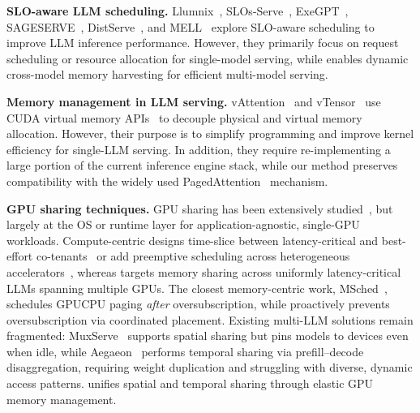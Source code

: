 

\label{sec:rw}

\noindent\textbf{SLO-aware LLM scheduling.}
Llumnix~\cite{sun2024llumnix}, SLOs-Serve~\cite{chen2025slos}, ExeGPT~\cite{oh2024exegpt}, SAGESERVE~\cite{sageserve}, DistServe~\cite{zhong2024distserve}, and MELL~\cite{qianli2025mell} explore SLO-aware scheduling to improve LLM inference performance.
However, they primarily focus on request scheduling or resource allocation for single-model serving, while \tool enables dynamic cross-model memory harvesting for efficient multi-model serving.

\noindent\textbf{Memory management in LLM serving.} 
vAttention~\cite{prabhu2024vattentiondynamicmemorymanagement} and vTensor~\cite{vtensor} use CUDA virtual memory APIs~\cite{cuda-vmm} to decouple physical and virtual memory allocation.
However, their purpose is to simplify programming 
and improve kernel efficiency for single-LLM serving. 
In addition, they require re-implementing a large portion of the current inference engine stack, while our method preserves compatibility with the widely used PagedAttention~\cite{kwon2023efficient} mechanism.

\noindent\textbf{GPU sharing techniques.}
GPU sharing has been extensively studied~\cite{zhang2025sgdrc, zhang2025improving, ng2023paella, strati2024orion, han2022microsecond, han2024pantheon, tgs, yu2019salus, fgd@atc23, antman@osdi20, reef@osdi22, IADeep@sc23, zhao2023muxflowefficientsafegpu, chen2017effisha, wang2024gcaps, alpaserve@osdi23, muxserve, fu2024serverlessllm, qlm, aegaeon}, but largely at the OS or runtime layer for application-agnostic, single-GPU workloads. Compute-centric designs time-slice between latency-critical and best-effort co-tenants~\cite{tgs, gpreempt@atc25} or add preemptive scheduling across heterogeneous accelerators~\cite{xsched@osdi25}, whereas \tool targets memory sharing across uniformly latency-critical LLMs spanning multiple GPUs. The closest memory-centric work, MSched~\cite{msched}, schedules GPU\textendash CPU paging \emph{after} oversubscription, while \tool proactively prevents oversubscription via coordinated placement.  Existing multi-LLM solutions remain fragmented: MuxServe~\cite{muxserve} supports spatial sharing but pins models to devices even when idle, while Aegaeon~\cite{aegaeon} performs temporal sharing via prefill–decode disaggregation, requiring weight duplication and struggling with diverse, dynamic access patterns. \tool unifies spatial and temporal sharing through elastic GPU memory management.

